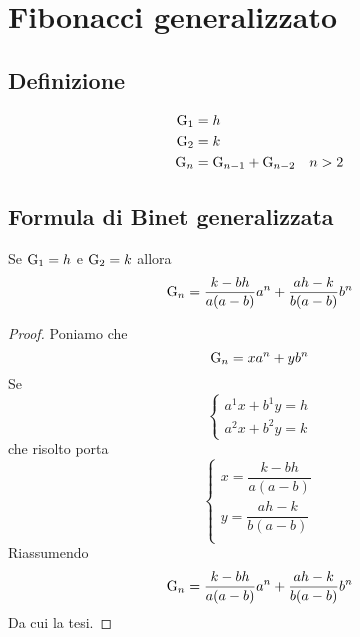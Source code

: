 \chapter{Fibonacci generalizzato}
\section{Definizione}
\begin{defn}
	\begin{align}
		\mathrm{G}_{1}={}&h\notag\\
		\mathrm{G}_{2}={}&k\notag\\
		\mathrm{G}_{n}={}&\mathrm{G}_{n-1}+\mathrm{G}_{n-2}\quad n>2\label{eqn:FiboGendef}
	\end{align}
\end{defn}
\section{Formula di Binet generalizzata}
\begin{thm}
Se $\mathrm{G}_{1}={}h$ e $\mathrm{G}_{2}={}k$ allora \begin{equation}
	\mathrm{G}_{n}={}\dfrac{k-bh}{a(a-b)}a^n+\dfrac{ah-k}{b(a-b)}b^n
\end{equation}\label{eqn:FormulaBinetgeneralizzata}
\end{thm}
\begin{proof}
Poniamo che \begin{equation}
	\mathrm{G}_{n}=xa^n+yb^n
\end{equation} Se
\begin{equation*}
	\left\{
	\begin{array}{l}
		a^1x+b^1y=h\\ a^2x+b^2y=k
	\end{array}
	\right.
\end{equation*}
che risolto porta
\begin{equation*}
	\left\{
	\begin{array}{l}
		x=\dfrac{k-bh}{a(a-b)}\\y=\dfrac{ah-k}{b(a-b)}\\
	\end{array}
	\right.
\end{equation*}
Riassumendo
 \begin{equation*}
	\mathrm{G}_{n}={}\dfrac{k-bh}{a(a-b)}a^n+\dfrac{ah-k}{b(a-b)}b^n
\end{equation*}
Da cui la tesi.
\end{proof}
